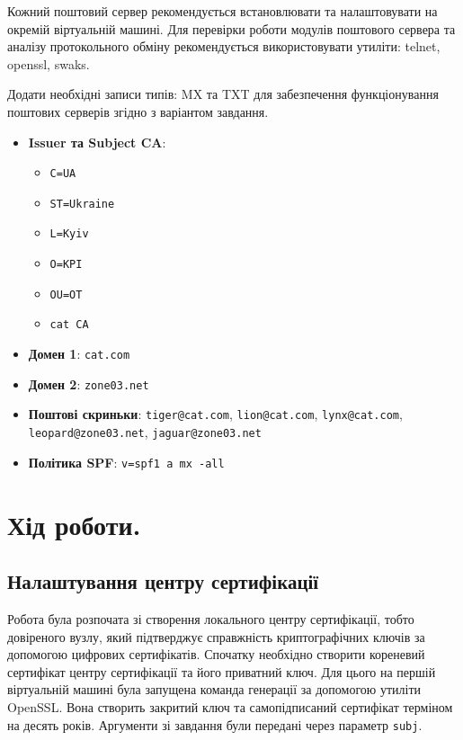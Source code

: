 \documentclass[14pt, a4paper]{extreport}
\begin{document}
	Кожний поштовий сервер рекомендується встановлювати та налаштовувати на окремій віртуальній машині. Для перевірки роботи модулів поштового сервера та аналізу протокольного обміну рекомендується використовувати утиліти: telnet, openssl, swaks.
	
	Додати необхідні записи типів: MX та TXT для забезпечення функціонування поштових серверів згідно з варіантом завдання.
	
	\begin{itemize}
		\item \textbf{Issuer та Subject CA}: 
		
		\begin{itemize}
			\item \texttt{C=UA}
			
			\item \texttt{ST=Ukraine}
			
			\item \texttt{L=Kyiv}
			
			\item \texttt{O=KPI}
			
			\item \texttt{OU=OT}
			
			\item \texttt{cat CA}
		\end{itemize}
		
		\item \textbf{Домен 1}: \texttt{cat.com}
		
		\item \textbf{Домен 2}: \texttt{zone03.net}
		
		\item \textbf{Поштові скриньки}: \texttt{tiger@cat.com}, \texttt{lion@cat.com}, \texttt{lynx@cat.com}, \texttt{leopard@zone03.net}, \texttt{jaguar@zone03.net}
		
		\item \textbf{Політика SPF}: \texttt{v=spf1 a mx -all}
	\end{itemize}
	
	\section*{Хід роботи.}
	
	\subsection*{Налаштування центру сертифікації}
	
	Робота була розпочата зі створення локального центру сертифікації, тобто довіреного вузлу, який підтверджує справжність криптографічних ключів за допомогою цифрових сертифікатів. Спочатку необхідно створити кореневий сертифікат центру сертифікації та його приватний ключ. Для цього на першій віртуальній машині була запущена команда генерації за допомогою утиліти OpenSSL. Вона створить закритий ключ та самопідписаний сертифікат терміном на десять років. Аргументи зі завдання були передані через параметр \texttt{subj}. 
	
\end{document}
